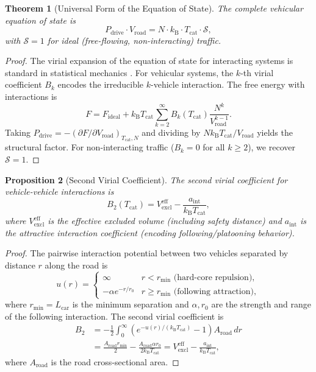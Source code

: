 \documentclass[twocolumn,10pt]{article}
\newtheorem{theorem}{Theorem}[section]
\newtheorem{proposition}[theorem]{Proposition}
\newcommand{\kB}{k_{\mathrm{B}}}
\newcommand{\Tcat}{T_{\mathrm{cat}}}
\newcommand{\Pdrive}{P_{\mathrm{drive}}}
\newcommand{\Vroad}{V_{\mathrm{road}}}
\newcommand{\Vexcl}{V_{\mathrm{excl}}}
\begin{document}
\begin{theorem}[Universal Form of the Equation of State]\label{thm:universal}
The complete vehicular equation of state is
\begin{equation}\label{eq:universal}
\Pdrive \cdot \Vroad = N \cdot \kB \cdot \Tcat \cdot \mathcal{S},
\end{equation}
with $\mathcal{S} = 1$ for ideal (free-flowing, non-interacting) traffic.
\end{theorem}

\begin{proof}
The virial expansion of the equation of state for interacting systems is standard in statistical mechanics \cite{landau1980, khinchin1949}. For vehicular systems, the $k$-th virial coefficient $B_k$ encodes the irreducible $k$-vehicle interaction. The free energy with interactions is
\begin{equation}
F = F_{\mathrm{ideal}} + \kB \Tcat \sum_{k=2}^{\infty} B_k(\Tcat) \frac{N^k}{\Vroad^{k-1}}.
\end{equation}
Taking $\Pdrive = -(\partial F / \partial \Vroad)_{\Tcat, N}$ and dividing by $N\kB\Tcat / \Vroad$ yields the structural factor. For non-interacting traffic ($B_k = 0$ for all $k \geq 2$), we recover $\mathcal{S} = 1$.
\end{proof}

\begin{proposition}[Second Virial Coefficient]\label{prop:virial}
The second virial coefficient for vehicle-vehicle interactions is
\begin{equation}
B_2(\Tcat) = \Vexcl^{\mathrm{eff}} - \frac{a_{\mathrm{int}}}{\kB \Tcat},
\end{equation}
where $\Vexcl^{\mathrm{eff}}$ is the effective excluded volume (including safety distance) and $a_{\mathrm{int}}$ is the attractive interaction coefficient (encoding following/platooning behavior).
\end{proposition}

\begin{proof}
The pairwise interaction potential between two vehicles separated by distance $r$ along the road is
\begin{equation}
u(r) = \begin{cases} \infty & r < r_{\mathrm{min}} \text{ (hard-core repulsion)}, \\ -\alpha e^{-r/r_0} & r \geq r_{\mathrm{min}} \text{ (following attraction)}, \end{cases}
\end{equation}
where $r_{\mathrm{min}} = L_{\mathrm{car}}$ is the minimum separation and $\alpha, r_0$ are the strength and range of the following interaction. The second virial coefficient is
\begin{align}
B_2 &= -\frac{1}{2}\int_0^{\infty} \left(e^{-u(r)/(\kB \Tcat)} - 1\right) A_{\mathrm{road}}\, dr \nonumber\\
&= \frac{A_{\mathrm{road}} r_{\mathrm{min}}}{2} - \frac{A_{\mathrm{road}} \alpha r_0}{2\kB \Tcat} = \Vexcl^{\mathrm{eff}} - \frac{a_{\mathrm{int}}}{\kB \Tcat},
\end{align}
where $A_{\mathrm{road}}$ is the road cross-sectional area.
\end{proof}
\end{document}
